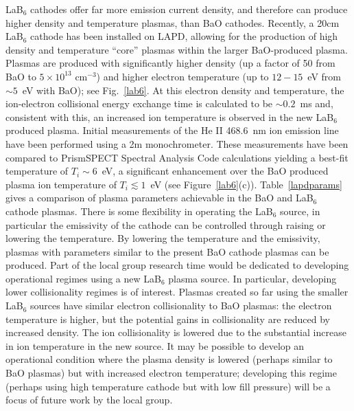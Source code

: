\documentclass[11pt]{article}
\begin{document}
LaB$_6$ cathodes offer far more emission current density, and
therefore can produce higher density and temperature plasmas, than BaO cathodes.
Recently, a 20cm LaB$_6$ cathode has been installed on LAPD, allowing for the production of high density and temperature
``core'' plasmas within the larger BaO-produced plasma. Plasmas are
produced with significantly higher density (up a factor of 50 from BaO
to $5\times 10^{13}$ cm$^{-3}$) and higher electron temperature (up to
$12-15$~eV from $\sim 5$~eV with BaO); see Fig.~\ref{lab6}. At this
electron density and temperature, the ion-electron collisional energy
exchange time is calculated to be $\sim 0.2$~ms and, consistent with
this, an increased ion temperature is observed in the new LaB$_6$
produced plasma. Initial measurements of the He II 468.6~nm
ion emission line have been performed using a 2m monochrometer. These
measurements have been compared to PrismSPECT Spectral Analysis Code
calculations yielding a best-fit temperature of $T_i \sim 6$~eV, a
significant enhancement over the BaO produced plasma ion temperature
of $T_i \lesssim 1$~eV (see Figure~\ref{lab6}(c)).
Table~\ref{lapdparams} gives a comparison of plasma parameters
achievable in the BaO and LaB$_6$ cathode plasmas.  There is some
flexibility in operating the LaB$_6$ source, in particular the
emissivity of the cathode can be controlled through raising or
lowering the temperature.  By lowering the temperature and the
emissivity, plasmas with parameters similar to the present BaO cathode plasmas can
be produced. Part of the local group research time would be dedicated
to developing operational regimes using a new LaB$_6$ plasma source. In
particular, developing lower collisionality regimes is of interest.
Plasmas created so far using the smaller LaB$_6$ sources have similar
electron collisionality to BaO plasmas: the electron temperature is
higher, but the potential gains in collisionality are reduced by increased
density.  The ion collisionality is lowered due to the substantial
increase in ion temperature in the new source.  It may be possible to
develop an operational condition where the plasma density is lowered
(perhaps similar to BaO plasmas) but with increased electron
temperature; developing this regime (perhaps using high temperature
cathode but with low fill pressure) will be a focus of future work by
the local group.  
\end{document}
